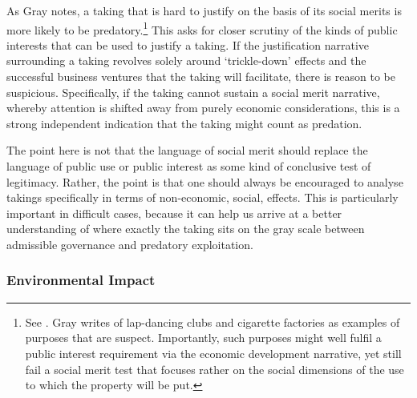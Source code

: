 As Gray notes, a taking that is hard to justify on the basis of its social merits is more likely to be predatory.\footnote{See \cite[34]{gray11}. Gray writes of lap-dancing clubs and cigarette factories as examples of purposes that are suspect. Importantly, such purposes might well fulfil a public interest requirement via the economic development narrative, yet still fail a social merit test that focuses rather on the social dimensions of the use to which the property will be put.} This asks for closer scrutiny of the kinds of public interests that can be used to justify a taking. If the justification narrative surrounding a taking revolves solely around `trickle-down' effects and the successful business ventures that the taking will facilitate, there is reason to be suspicious. Specifically, if the taking cannot sustain a social merit narrative, whereby attention is shifted away from purely economic considerations, this is a strong independent indication that the taking might count as predation.

The point here is not that the language of social merit should replace the language of public use or public interest as some kind of conclusive test of legitimacy. Rather, the point is that one should always be encouraged to analyse takings specifically in terms of non-economic, social, effects. This is particularly important in difficult cases, because it can help us arrive at a better understanding of where exactly the taking sits on the gray scale between admissible governance and predatory exploitation. 


\subsubsection*{Environmental Impact}

